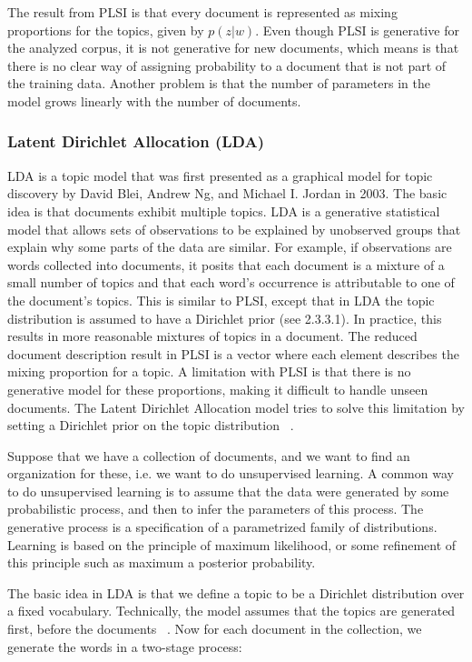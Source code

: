 \documentclass[12pt]{report}
\begin{document}
The result from PLSI is that every document is represented as mixing proportions
for the topics, given by $p(z|w)$. Even though PLSI is generative for the
analyzed corpus, it is not generative for new documents, which means is that
there is no clear way of assigning probability to a document that is not part
of the training data. Another problem is that the number of parameters in the
model grows linearly with the number of documents.


\subsubsection{Latent Dirichlet Allocation (LDA)}

LDA is a topic model that was first presented as a graphical model for topic
discovery by David Blei, Andrew Ng, and Michael I. Jordan in 2003. The basic
idea is that documents exhibit multiple topics. LDA is a generative statistical
model that allows sets of observations to be explained by unobserved groups
that explain why some parts of the data are similar. For example, if
observations are words collected into documents, it posits that each document
is a mixture of a small number of topics and that each word's occurrence is
attributable to one of the document's topics. This is similar to PLSI, except
that in LDA the topic distribution is assumed to have a Dirichlet prior (see
2.3.3.1). In practice, this results in more reasonable mixtures of topics in a
document. The reduced document description result in PLSI is a vector where
each element describes the mixing proportion for a topic. A limitation with
PLSI is that there is no generative model for these proportions, making it
difficult to handle unseen documents. The Latent Dirichlet Allocation model
tries to solve this limitation by setting a Dirichlet prior on the topic
distribution ~\cite{blei2003latent}.
 
Suppose that we have a collection of documents, and we want to find an
organization for these, i.e. we want to do unsupervised learning. A common way
to do unsupervised learning is to assume that the data were generated by some
probabilistic process, and then to infer the parameters of this process. The
generative process is a specification of a parametrized family of
distributions. Learning is based on the principle of maximum likelihood, or
some refinement of this principle such as maximum a posterior probability.
 
The basic idea in LDA is that we define a topic to be a Dirichlet distribution
over a fixed vocabulary. Technically, the model assumes that the topics are
generated first, before the documents ~\cite{Blei11introductionto}. Now for each document in the collection,
we generate the words in a two-stage process:
\end{document}
